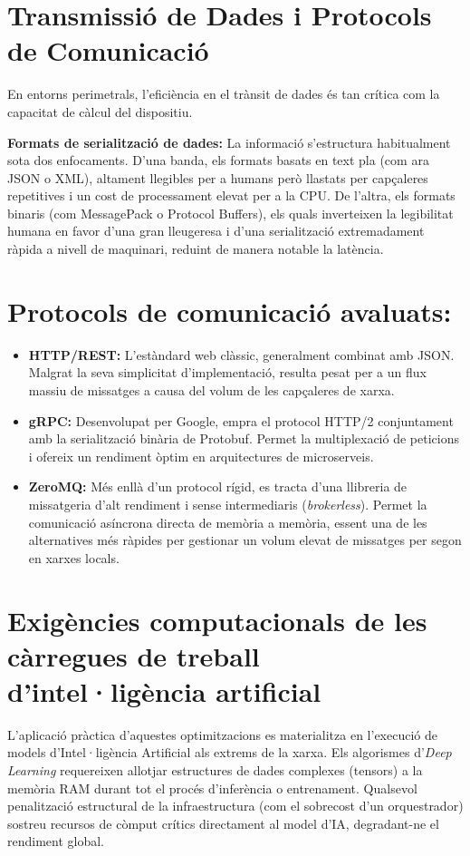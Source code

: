 \section{Transmissió de Dades i Protocols de Comunicació}
En entorns perimetrals, l'eficiència en el trànsit de dades és tan crítica com la capacitat de càlcul del dispositiu.

\textbf{Formats de serialització de dades:}
La informació s'estructura habitualment sota dos enfocaments. D'una banda, els formats basats en text pla (com ara JSON o XML), altament llegibles per a humans però llastats per capçaleres repetitives i un cost de processament elevat per a la CPU. De l'altra, els formats binaris (com MessagePack o Protocol Buffers), els quals inverteixen la legibilitat humana en favor d'una gran lleugeresa i d'una serialització extremadament ràpida a nivell de maquinari, reduint de manera notable la latència.

\section{Protocols de comunicació avaluats:}
\begin{itemize}
    \item \textbf{HTTP/REST:} L'estàndard web clàssic, generalment combinat amb JSON. Malgrat la seva simplicitat d'implementació, resulta pesat per a un flux massiu de missatges a causa del volum de les capçaleres de xarxa.
    \item \textbf{gRPC:} Desenvolupat per Google, empra el protocol HTTP/2 conjuntament amb la serialització binària de Protobuf. Permet la multiplexació de peticions i ofereix un rendiment òptim en arquitectures de microserveis.
    \item \textbf{ZeroMQ:} Més enllà d'un protocol rígid, es tracta d'una llibreria de missatgeria d'alt rendiment i sense intermediaris (\textit{brokerless}). Permet la comunicació asíncrona directa de memòria a memòria, essent una de les alternatives més ràpides per gestionar un volum elevat de missatges per segon en xarxes locals.
\end{itemize}

\section{Exigències computacionals de les càrregues de treball d'intel·ligència artificial}
L'aplicació pràctica d'aquestes optimitzacions es materialitza en l'execució de models d'Intel·ligència Artificial als extrems de la xarxa. Els algorismes d'\textit{Deep Learning} requereixen allotjar estructures de dades complexes (tensors) a la memòria RAM durant tot el procés d'inferència o entrenament. Qualsevol penalització estructural de la infraestructura (com el sobrecost d'un orquestrador) sostreu recursos de còmput crítics directament al model d'IA, degradant-ne el rendiment global.

